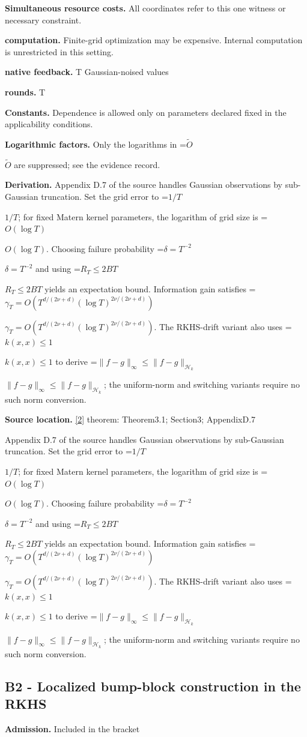 \documentclass[10pt,a4paper]{article}
\newcommand{\AtlasMath}[1]{\par\begingroup\centering\setbox0=\hbox{$\displaystyle #1$}\ifdim\wd0>1.4\linewidth\typeout{ATLAS WIDE FORMULA: \the\wd0}\fi\ifdim\wd0>\linewidth\resizebox{\linewidth}{!}{\box0}\else\box0\fi\par\endgroup}
\newcommand{\AtlasInlineMath}[1]{\begingroup\setbox0=\hbox{$#1$}\ifdim\wd0>.4\linewidth\endgroup\AtlasMath{#1}\else\endgroup$#1$\fi}
\begin{document}
\textbf{Simultaneous resource costs.} All coordinates refer to this one witness or necessary constraint.

\textbf{computation.} Finite-grid optimization may be expensive. Internal computation is unrestricted in this setting.

\textbf{native feedback.} T Gaussian-noised values

\textbf{rounds.} T

\textbf{Constants.} Dependence is allowed only on parameters declared fixed in the applicability conditions.

\textbf{Logarithmic factors.} Only the logarithms in \AtlasInlineMath{\widetilde O} are suppressed; see the evidence record.

\textbf{Derivation.} Appendix D.7 of the source handles Gaussian observations by sub-Gaussian truncation. Set the grid error to \AtlasInlineMath{1/T}; for fixed Matern kernel parameters, the logarithm of grid size is \AtlasInlineMath{O(\log T)}. Choosing failure probability \AtlasInlineMath{\delta=T^{-2}} and using \AtlasInlineMath{R_T\le2BT} yields an expectation bound. Information gain satisfies \AtlasInlineMath{\gamma_T=O(T^{d/(2\nu+d)}(\log T)^{2\nu/(2\nu+d)})}. The RKHS-drift variant also uses \AtlasInlineMath{k(x,x)\le1} to derive \AtlasInlineMath{\|f-g\|_\infty\le\|f-g\|_{\mathcal H_k}}; the uniform-norm and switching variants require no such norm conversion.

\textbf{Source location.} \href{https://proceedings.mlr.press/v206/hong23b.html}{[2]} theorem: Theorem3.1; Section3; AppendixD.7

Appendix D.7 of the source handles Gaussian observations by sub-Gaussian truncation. Set the grid error to \AtlasInlineMath{1/T}; for fixed Matern kernel parameters, the logarithm of grid size is \AtlasInlineMath{O(\log T)}. Choosing failure probability \AtlasInlineMath{\delta=T^{-2}} and using \AtlasInlineMath{R_T\le2BT} yields an expectation bound. Information gain satisfies \AtlasInlineMath{\gamma_T=O(T^{d/(2\nu+d)}(\log T)^{2\nu/(2\nu+d)})}. The RKHS-drift variant also uses \AtlasInlineMath{k(x,x)\le1} to derive \AtlasInlineMath{\|f-g\|_\infty\le\|f-g\|_{\mathcal H_k}}; the uniform-norm and switching variants require no such norm conversion.

\subsection{B2 - Localized bump-block construction in the RKHS}
\textbf{Admission.} Included in the bracket
\end{document}
